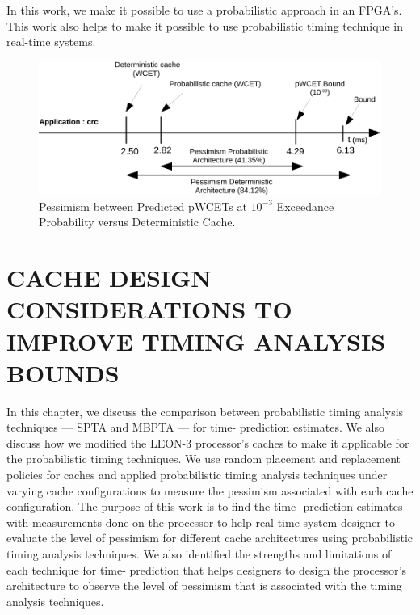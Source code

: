  
 
 









In this work, we make it possible to use
 a probabilistic approach in an FPGA's. This work also helps to make it possible to use probabilistic timing technique in real-time systems.
\begin{figure}[h]
   \includegraphics[scale=0.8]{figures/tpc-example1.pdf}
  \caption{Pessimism between Predicted pWCETs at $10^{-3}$ Exceedance Probability versus Deterministic Cache.}
\label{application:crc}
\end{figure}



















\section{CACHE DESIGN CONSIDERATIONS TO IMPROVE TIMING ANALYSIS BOUNDS}





In this chapter, we discuss the comparison between probabilistic timing analysis techniques --- SPTA and MBPTA --- for time- prediction estimates.  We also discuss how we modified the LEON-3
processor's caches to make it applicable for the probabilistic timing techniques.  We use random placement and replacement policies for caches and applied probabilistic timing analysis techniques under varying
cache configurations to measure the pessimism associated with each cache configuration. The purpose of this work is to find the time- prediction estimates with measurements done
on the processor to help real-time system designer to
evaluate the level of pessimism for different  cache architectures
using  probabilistic timing analysis techniques. We also identified the strengths and limitations of each technique for time-
prediction that helps designers to design the processor's architecture to observe the level of pessimism that is associated with the timing analysis techniques.


